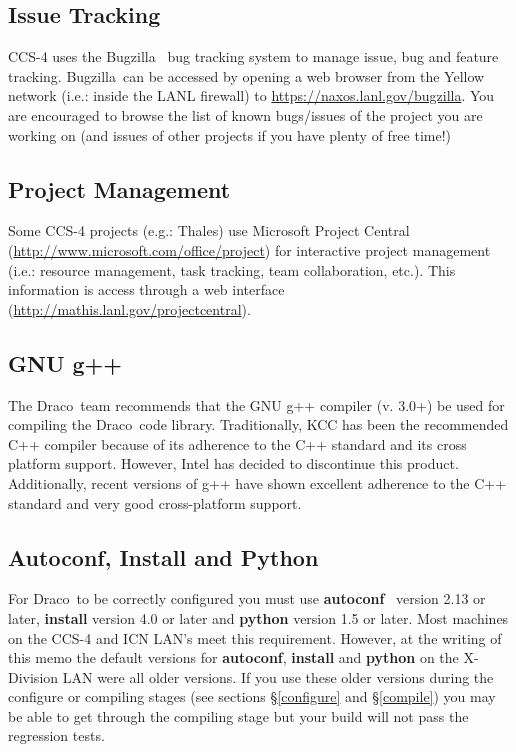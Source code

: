 \documentclass[11pt]{nmemo}
\newcommand{\draco}{{\normalfont\sffamily Draco}}
\newcommand{\thales}{{\normalfont\sffamily Thales}}
\newcommand{\bugz}{{\normalfont\sffamily Bugzilla}}
\begin{document}
\subsection{Issue Tracking}

CCS-4 uses the \bugz~\cite{bugz} bug tracking system to manage issue,
bug and feature tracking.  \bugz\ can be accessed by opening a web
browser from the Yellow network (i.e.: inside the LANL firewall) to
\url{https://naxos.lanl.gov/bugzilla}.  You are encouraged to browse
the list of known bugs/issues of the project you are working on (and
issues of other projects if you have plenty of free time!)

\subsection{Project Management}

Some CCS-4 projects (e.g.: \thales) use Microsoft Project Central %
(\url{http://www.microsoft.com/office/project}) for interactive
project management (i.e.: resource management, task tracking, team
collaboration, etc.).  This information is access through a web
interface (\url{http://mathis.lanl.gov/projectcentral}).

\subsection{GNU g++}

The \draco\ team recommends that the GNU g++ compiler (v. 3.0+) be
used for compiling the \draco\ code library.  Traditionally, KCC has
been the recommended C++ compiler because of its adherence to the C++
standard and its cross platform support.  However, Intel has decided
to discontinue this product.  Additionally, recent versions of g++
have shown excellent adherence to the C++ standard and very good
cross-platform support.  

\subsection{Autoconf, Install and Python}

For \draco\ to be correctly configured you must use
\textbf{autoconf}~\cite{autoconf} version 2.13 or later,
\textbf{install} version 4.0 or later and \textbf{python} version 1.5
or later.  Most machines on the CCS-4 and ICN LAN's meet this
requirement.  However, at the writing of this memo the default
versions for \textbf{autoconf}, \textbf{install} and \textbf{python}
on the X-Division LAN were all older versions.  If you use these older
versions during the configure or compiling stages (see sections
\S\ref{configure} and \S\ref{compile}) you may be able to get through
the compiling stage but your build will not pass the regression tests.
\end{document}
